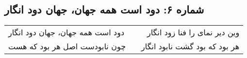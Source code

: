 \begin{center}
\section*{شماره ۶: دود است همه جهان، جهان دود انگار}
\label{sec:006}
\begin{longtable}{l p{0.5cm} r}
دود است همه جهان، جهان دود انگار
&&
وین دیر نمای را فنا زود انگار
\\
چون نابودست اصل هر بود که هست
&&
هر بود که بود گشت نابود انگار
\\
\end{longtable}
\end{center}

